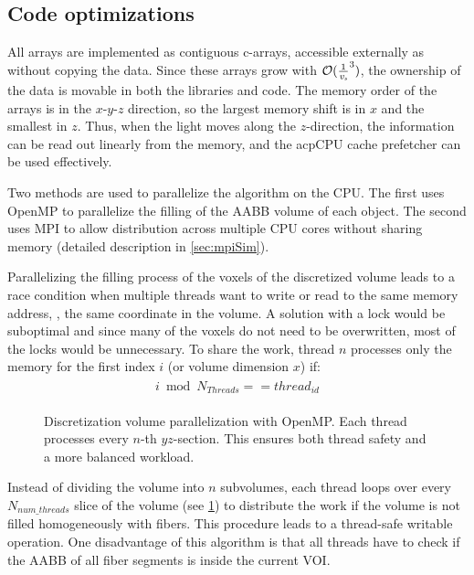 \subsection{Code optimizations}\label{sec:dvOpti}
%
All arrays are implemented as contiguous c-arrays, accessible externally as  without copying the data.
Since these arrays grow with $\mathcal{O}(\frac{1}{\textnormal{$\mathit{v_{s}}$}}^3)$, the ownership of the data is movable in both the \cpp{} libraries and \python{} code.
The memory order of the arrays is in the $x\text{-}y\text{-}z$ direction, so the largest memory shift is in $x$ and the smallest in $z$.
Thus, when the light moves along the $z$-direction, the information can be read out linearly from the memory, and the acp{CPU} cache prefetcher can be used effectively.
\par
%
Two methods are used to parallelize the algorithm on the \ac{CPU}.
The first uses \ac{OpenMP} to parallelize the filling of the \ac{AABB} volume of each object.
The second uses \ac{MPI} to allow distribution across multiple \ac{CPU} cores without sharing memory (detailed description in \cref{sec:mpiSim}).
\par
%
Parallelizing the filling process of the voxels of the discretized volume leads to a race condition when multiple threads want to write or read to the same memory address, \ie{}, the same coordinate in the volume.
A solution with a lock would be suboptimal and since many of the voxels do not need to be overwritten, most of the locks would be unnecessary.
To share the work, thread $n$ processes only the memory for the first index $i$ (or volume dimension $x$) if:
%
\begin{align}
\begin{split}
    i \bmod N_{\mathit{Threads}} == \mathit{thread}_{\mathit{id}}
\end{split}
\end{align}
%
\begin{figure}[!t]
\centering
\setlength{\tikzwidth}{0.5\textwidth}
\caption[]{Discretization volume parallelization with \ac{OpenMP}. Each thread processes every $n$-th $yz$-section. This ensures both thread safety and a more balanced workload.}
\label{fig:discVolThread}
\end{figure}
%
Instead of dividing the volume into $n$ subvolumes, each thread loops over every $N_{\mathit{num\_threads}}$ slice of the volume (see \cref{fig:discVolThread}) to distribute the work if the volume is not filled homogeneously with fibers.
This procedure leads to a thread-safe writable operation.
One disadvantage of this algorithm is that all threads have to check if the \ac{AABB} of all fiber segments is inside the current \ac{VOI}.
%
%
%
